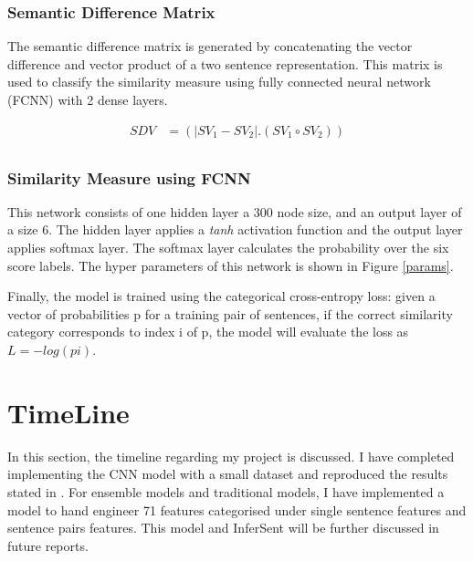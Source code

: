 \documentclass[12pt]{report} %
\begin{document}
	
	\subsubsection*{Semantic Difference Matrix}
	The semantic difference matrix is generated by concatenating the vector difference and vector product of a two sentence representation. This matrix is used to classify the similarity measure using fully connected neural network (FCNN) with 2 dense layers. 
	
		\begin{align*} 
			SDV & =(|SV_{1}- SV_{2}|.(SV_{1} \circ SV_{2})) \\
		\end{align*}
	
	\subsubsection*{Similarity Measure using FCNN}
	
	 This network consists of one hidden layer a 300 node size, and an output layer of a size 6. The hidden layer applies a \textit{tanh} activation function and the output layer applies softmax layer. The softmax layer calculates the probability over the six score labels. The hyper parameters of this network is shown in Figure \ref{params}.
	 
	 Finally, the model is trained using the categorical cross-entropy loss: given a vector of probabilities p for a training pair of sentences, if the correct similarity category corresponds to index i of p, the model will evaluate the loss as $L = − log(pi)$.
	 	
	\section{TimeLine}
	In this section, the timeline regarding my project is discussed. I have completed implementing the CNN model with a small dataset and reproduced the results stated in \cite{shao2017hcti}. For ensemble models and traditional models, I have implemented a model to hand engineer 71 features categorised under single sentence features and sentence pairs features. This model and InferSent will be further discussed in future reports. 
	
\end{document}
